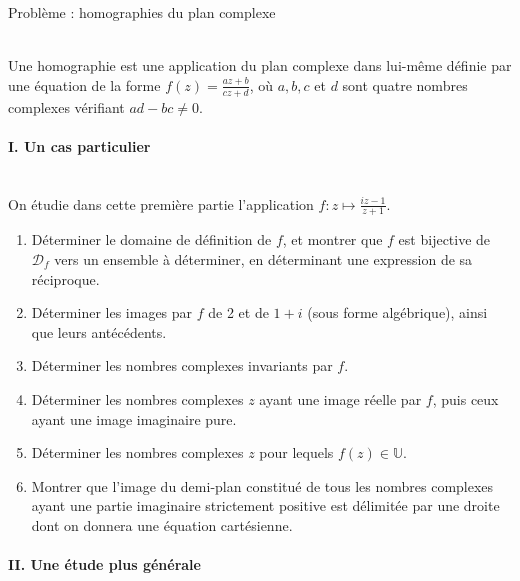 \documentclass[a4paper, 11pt,reqno]{article}
\begin{document}
\newpage
\begin{center}
\Large{Problème : homographies du plan complexe}
\end{center}

\noindent\\
Une homographie est une application du plan complexe dans lui-même définie par une équation de la forme $f(z)=\frac{a z+b}{c z+d}$, où $a, b, c$ et $d$ sont quatre nombres complexes vérifiant $a d-b c \neq 0$.

\paragraph{I. Un cas particulier}

\noindent\\
On étudie dans cette première partie l'application $f: z \mapsto \frac{i z-1}{z+1}$.
\begin{enumerate}
\item Déterminer le domaine de définition de $f$, et montrer que $f$ est bijective de $\mathcal{D}_{f}$ vers un ensemble à déterminer, en déterminant une expression de sa réciproque.
\item Déterminer les images par $f$ de 2 et de $1+i$ (sous forme algébrique), ainsi que leurs antécédents.
\item  Déterminer les nombres complexes invariants par $f$.
\item  Déterminer les nombres complexes $z$ ayant une image réelle par $f$, puis ceux ayant une image imaginaire pure.
\item  Déterminer les nombres complexes $z$ pour lequels $f(z) \in \mathbb{U}$.
\item  Montrer que l'image du demi-plan constitué de tous les nombres complexes ayant une partie imaginaire strictement positive est délimitée par une droite dont on donnera une équation cartésienne.
\end{enumerate}

\paragraph{II. Une étude plus générale}
\end{document}
